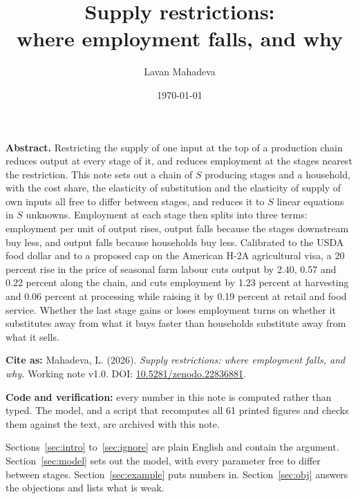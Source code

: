 \documentclass[11pt,a4paper]{article}
\title{\textbf{Supply restrictions:\\where employment falls, and why}}
\author{Lavan Mahadeva}
\date{\today}
\begin{document}
\maketitle
\thispagestyle{fancy}

\begin{center}
\begin{minipage}{0.92\textwidth}
\small
\textbf{Abstract.} Restricting the supply of one input at the top of a production chain reduces output at every stage of it, and reduces employment at the stages nearest the restriction. This note sets out a chain of $S$ producing stages and a household, with the cost share, the elasticity of substitution and the elasticity of supply of own inputs all free to differ between stages, and reduces it to $S$ linear equations in $S$ unknowns. Employment at each stage then splits into three terms: employment per unit of output rises, output falls because the stages downstream buy less, and output falls because households buy less. Calibrated to the USDA food dollar and to a proposed cap on the American H-2A agricultural visa, a 20 percent rise in the price of seasonal farm labour cuts output by 2.40, 0.57 and 0.22 percent along the chain, and cuts employment by 1.23 percent at harvesting and 0.06 percent at processing while raising it by 0.19 percent at retail and food service. Whether the last stage gains or loses employment turns on whether it substitutes away from what it buys faster than households substitute away from what it sells.
\end{minipage}
\end{center}

\medskip

\begin{center}
\begin{minipage}{0.92\textwidth}
\footnotesize
\textbf{Cite as:} Mahadeva, L. (2026). \emph{Supply restrictions: where employment falls, and why.} Working note v1.0. DOI: \href{https://doi.org/10.5281/zenodo.22836881}{10.5281/zenodo.22836881}.

\textbf{Code and verification:} every number in this note is computed rather than typed. The model, and a script that recomputes all 61 printed figures and checks them against the text, are archived with this note.
\end{minipage}
\end{center}

\bigskip

Sections~\ref{sec:intro} to~\ref{sec:ignore} are plain English and contain the argument. Section~\ref{sec:model} sets out the model, with every parameter free to differ between stages. Section~\ref{sec:example} puts numbers in. Section~\ref{sec:obj} answers the objections and lists what is weak.
\end{document}
